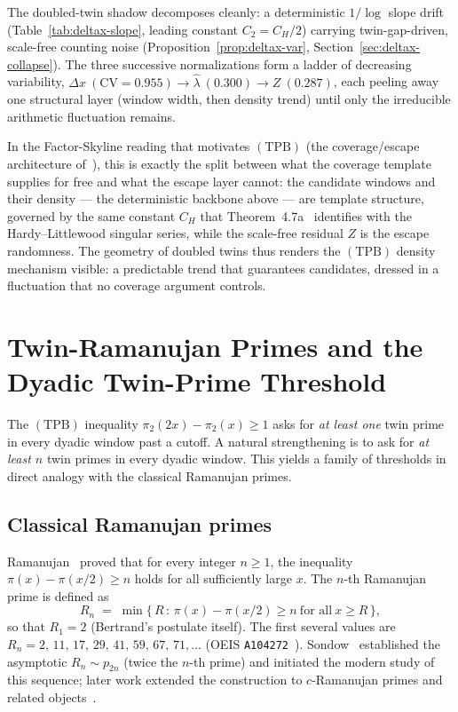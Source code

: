 \documentclass[11pt]{article}
\begin{document}
The doubled-twin shadow decomposes cleanly: a deterministic $1/\log$ slope
drift (Table~\ref{tab:deltax-slope}, leading constant $C_2=C_H/2$) carrying
twin-gap-driven, scale-free counting noise
(Proposition~\ref{prop:deltax-var}, Section~\ref{sec:deltax-collapse}). The
three successive normalizations form a ladder of decreasing variability,
$\Delta x\ (\mathrm{CV}=0.955)\to\widehat\lambda\ (0.300)\to Z\ (0.287)$, each
peeling away one structural layer (window width, then density trend) until
only the irreducible arithmetic fluctuation remains.

In the Factor-Skyline reading that motivates $(\mathrm{TPB})$ (the
coverage/escape architecture of~\cite{FS1}), this is exactly the split between
what the coverage template supplies for free and what the escape layer cannot:
the
candidate windows and their density --- the deterministic backbone above ---
are template structure, governed by the same constant $C_H$ that
Theorem~4.7a~\cite{FS1} identifies with the Hardy--Littlewood singular series,
while the scale-free residual $Z$ is the escape randomness. The geometry of
doubled twins thus renders the $(\mathrm{TPB})$ density mechanism visible: a
predictable trend that guarantees candidates, dressed in a fluctuation that no
coverage argument controls.

\section{Twin-Ramanujan Primes and the Dyadic Twin-Prime Threshold}
\label{sec:twin-ramanujan}

The $(\mathrm{TPB})$ inequality $\pi_2(2x)-\pi_2(x)\ge 1$ asks for
\emph{at least one} twin prime in every dyadic window past a cutoff.
A natural strengthening is to ask for \emph{at least $n$} twin primes
in every dyadic window. This yields a family of thresholds in direct
analogy with the classical Ramanujan primes.

\subsection{Classical Ramanujan primes}

Ramanujan~\cite{Ramanujan1919} proved that for every integer $n\ge 1$,
the inequality $\pi(x)-\pi(x/2)\ge n$ holds for all sufficiently large
$x$. The $n$-th Ramanujan prime is defined as
\begin{equation}\label{eq:R-classical}
R_n \;=\; \min\Big\{\,R\,:\,\pi(x)-\pi(x/2)\ge n\ \text{for all}\ x\ge R\,\Big\},
\end{equation}
so that $R_1=2$ (Bertrand's postulate itself). The first several values are
$R_n=2,\,11,\,17,\,29,\,41,\,59,\,67,\,71,\ldots$
(OEIS \texttt{A104272}~\cite{OEIS_A104272}). Sondow~\cite{Sondow2009}
established the asymptotic $R_n\sim p_{2n}$ (twice the $n$-th prime)
and initiated the modern study of this sequence; later work extended
the construction to $c$-Ramanujan primes and related
objects~\cite{Amersi2014,Paksoy2012}.
\end{document}

